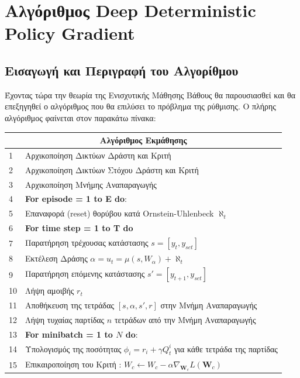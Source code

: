 \documentclass[11pt]{article} %
\numberwithin{equation}{subsection}
\begin{document}
\newpage

\section{Αλγόριθμος Deep Deterministic Policy Gradient}

\subsection{Εισαγωγή και Περιγραφή του Αλγορίθμου}
Έχοντας τώρα την θεωρία της Ενισχυτικής Μάθησης Βάθους θα παρουσιασθεί και θα επεξηγηθεί ο αλγόριθμος \cite{deepmind, stupidpaper, stupidpaper2} που θα επιλύσει το πρόβλημα της ρύθμισης. Ο πλήρης αλγόριθμος φαίνεται στον παρακάτω πίνακα:

\begin{table}[H]
\centering
\begin{tabular}{|p{0.3cm}|p{12cm}|}
\hline
\multicolumn{2}{|c|}{\textbf{Αλγόριθμος Εκμάθησης}} \\
\hline
1 & Αρχικοποίηση Δικτύων Δράστη και Κριτή \\
\hline
2 & Αρχικοποίηση Δικτύων Στόχου Δράστη και Κριτή\\
\hline
3 & Αρχικοποίηση Μνήμης Αναπαραγωγής \\
\hline
4  & \textbf{For episode = 1 to E do}: \\
\hline
5  & Επαναφορά (reset) θορύβου κατά Ornstein-Uhlenbeck $\aleph_t$  \\
\hline
6 & \textbf{For time step = 1 to T do} \\
\hline
7 & Παρατήρηση τρέχουσας κατάστασης $s = [y_t, y_{set}]$ \\
\hline
8 & Εκτέλεση Δράσης $α = u_t = \mu(s, W_α) + \aleph_t $\\
\hline
9 & Παρατήρηση επόμενης κατάστασης $s' = [y_{t+1}, y_{set}]$\\
\hline
10 & Λήψη αμοιβής $r_t$\\
\hline
11 & Αποθήκευση της τετράδας $[s, α, s', r]$ στην Μνήμη Αναπαραγωγής\\
\hline
12 & Λήψη τυχαίας παρτίδας $n$ τετράδων από την Μνήμη Αναπαραγωγής\\
\hline
13 & \textbf{For minibatch = 1 to $N$ do}: \\
\hline
14 & Υπολογισμός της ποσότητας $\phi_i = r_i + \gamma Q_t ^ i$ για κάθε τετράδα της παρτίδας\\
\hline
15 & Επικαιροποίηση του Κριτή : $W_c \leftarrow W_c - \alpha \nabla_{\textbf{W}_c} L(\textbf{W}_{c})$\\

\end{tabular}
\end{table}
\end{document}
